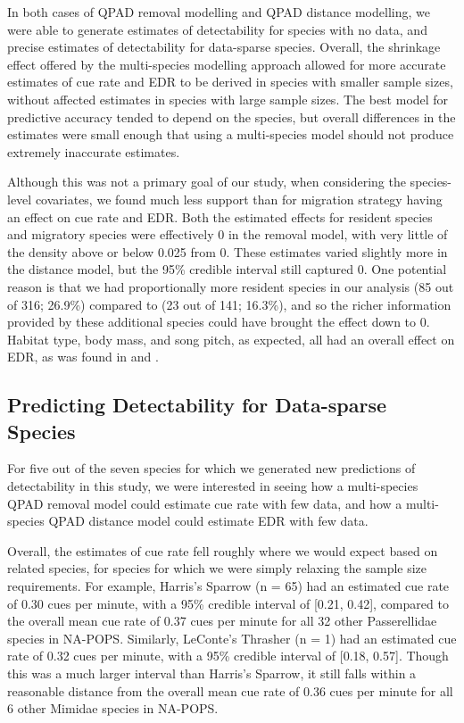 \documentclass[12pt]{article}
\begin{document}
\par In both cases of QPAD removal modelling and QPAD distance modelling, we were able to generate estimates of detectability for species with no data, and precise estimates of detectability for data-sparse species.
Overall, the shrinkage effect offered by the multi-species modelling approach allowed for more accurate estimates of cue rate and EDR to be derived in species with smaller sample sizes, without affected estimates in species with large sample sizes.
The best model for predictive accuracy tended to depend on the species, but overall differences in the estimates were small enough that using a multi-species model should not produce extremely inaccurate estimates.

\par Although this was not a primary goal of our study, when considering the species-level covariates, we found much less support than \citet{solymos_phylogeny_2018} for migration strategy having an effect on cue rate and EDR.
Both the estimated effects for resident species and migratory species were effectively 0 in the removal model, with very little of the density above or below 0.025 from 0.
These estimates varied slightly more in the distance model, but the 95\% credible interval still captured 0.
One potential reason is that we had proportionally more resident species in our analysis (85 out of 316; 26.9\%) compared to \citet{solymos_phylogeny_2018} (23 out of 141; 16.3\%), and so the richer information provided by these additional species could have brought the effect down to 0.
Habitat type, body mass, and song pitch, as expected, all had an overall effect on EDR, as was found in \citet{solymos_phylogeny_2018} and \cite{johnston_species_2014}.

\subsection{Predicting Detectability for Data-sparse Species}

\par For five out of the seven species for which we generated new predictions of detectability in this study, we were interested in seeing how a multi-species QPAD removal model could estimate cue rate with few data, and how a multi-species QPAD distance model could estimate EDR with few data.

\par Overall, the estimates of cue rate fell roughly where we would expect based on related species, for species for which we were simply relaxing the sample size requirements.
For example, Harris's Sparrow (n = 65) had an estimated cue rate of 0.30 cues per minute, with a 95\% credible interval of [0.21, 0.42], compared to the overall mean cue rate of 0.37 cues per minute for all 32 other Passerellidae species in NA-POPS.
Similarly, LeConte's Thrasher (n = 1) had an estimated cue rate of 0.32 cues per minute, with a 95\% credible interval of [0.18, 0.57].
Though this was a much larger interval than Harris's Sparrow, it still falls within a reasonable distance from the overall mean cue rate of 0.36 cues per minute for all 6 other Mimidae species in NA-POPS.
\end{document}
